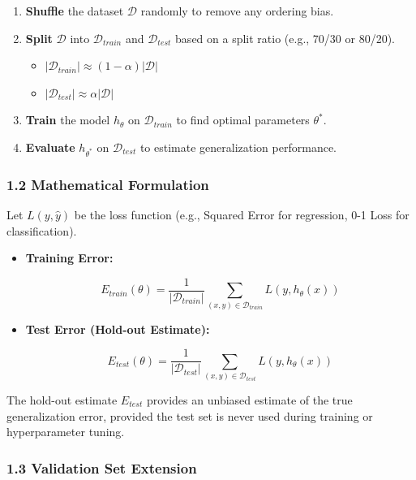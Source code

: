 \documentclass[
  italian,
  11pt,
]{article}
\begin{document}
\begin{enumerate}
\def\labelenumi{\arabic{enumi}.}
\item
  \textbf{Shuffle} the dataset \(\mathcal{D}\) randomly to remove any
  ordering bias.
\item
  \textbf{Split} \(\mathcal{D}\) into \(\mathcal{D}_{train}\) and
  \(\mathcal{D}_{test}\) based on a split ratio (e.g., 70/30 or 80/20).

  \begin{itemize}
  \item
    \(|\mathcal{D}_{train}| \approx (1 - \alpha) |\mathcal{D}|\)
  \item
    \(|\mathcal{D}_{test}| \approx \alpha |\mathcal{D}|\)
  \end{itemize}
\item
  \textbf{Train} the model \(h_\theta\) on \(\mathcal{D}_{train}\) to
  find optimal parameters \(\theta^*\).
\item
  \textbf{Evaluate} \(h_{\theta^*}\) on \(\mathcal{D}_{test}\) to
  estimate generalization performance.
\end{enumerate}

\subsubsection{1.2 Mathematical
Formulation}\label{mathematical-formulation}

Let \(L(y, \hat{y})\) be the loss function (e.g., Squared Error for
regression, 0-1 Loss for classification).

\begin{itemize}
\item
  \textbf{Training Error:}

  \[E_{train}(\theta) = \frac{1}{|\mathcal{D}_{train}|} \sum_{(x, y) \in \mathcal{D}_{train}} L(y, h_\theta(x))\]
\item
  \textbf{Test Error (Hold-out Estimate):}

  \[E_{test}(\theta) = \frac{1}{|\mathcal{D}_{test}|} \sum_{(x, y) \in \mathcal{D}_{test}} L(y, h_\theta(x))\]
\end{itemize}

The hold-out estimate \(E_{test}\) provides an unbiased estimate of the
true generalization error, provided the test set is never used during
training or hyperparameter tuning.

\subsubsection{1.3 Validation Set
Extension}\label{validation-set-extension}
\end{document}
